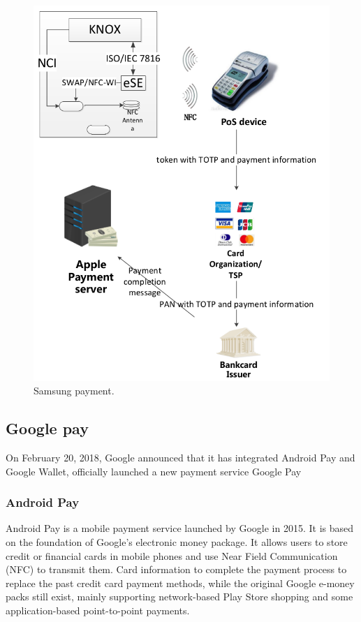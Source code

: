 \documentclass[journal]{IEEEtran}
\begin{document}
\begin{figure}[htbp]
\centerline{\includegraphics[scale=0.4]{samxing_pay.png}}
\caption{Samsung payment.}
\label{fig}
\end{figure}



\subsection{Google pay}
On February 20, 2018, Google announced that it has integrated Android Pay and Google Wallet, officially launched a new payment service Google Pay

\subsubsection{Android Pay}Android Pay is a mobile payment service launched by Google in 2015. It is based on the foundation of Google's electronic money package. It allows users to store credit or financial cards in mobile phones and use Near Field Communication (NFC) to transmit them. Card information to complete the payment process to replace the past credit card payment methods, while the original Google e-money packs still exist, mainly supporting network-based Play Store shopping and some application-based point-to-point payments.
\end{document}
